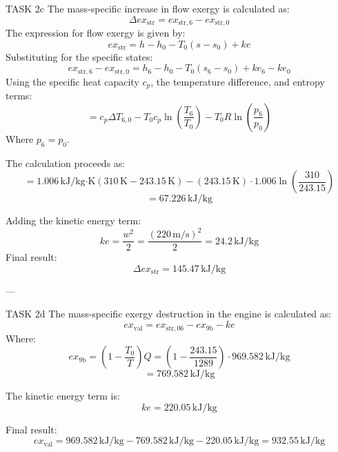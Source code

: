 TASK 2c  
The mass-specific increase in flow exergy is calculated as:  
\[
\Delta ex_{\text{str}} = ex_{\text{str},6} - ex_{\text{str},0}
\]  
The expression for flow exergy is given by:  
\[
ex_{\text{str}} = h - h_0 - T_0 (s - s_0) + ke
\]  
Substituting for the specific states:  
\[
ex_{\text{str},6} - ex_{\text{str},0} = h_6 - h_0 - T_0 (s_6 - s_0) + ke_6 - ke_0
\]  
Using the specific heat capacity \( c_p \), the temperature difference, and entropy terms:  
\[
= c_p \Delta T_{6,0} - T_0 c_p \ln \left( \frac{T_6}{T_0} \right) - T_0 R \ln \left( \frac{p_6}{p_0} \right)
\]  
Where \( p_6 = p_0 \).  

The calculation proceeds as:  
\[
= 1.006 \, \text{kJ/kg·K} \left( 310 \, \text{K} - 243.15 \, \text{K} \right) - (243.15 \, \text{K}) \cdot 1.006 \ln \left( \frac{310}{243.15} \right)
\]  
\[
= 67.226 \, \text{kJ/kg}
\]  

Adding the kinetic energy term:  
\[
ke = \frac{w^2}{2} = \frac{(220 \, \text{m/s})^2}{2} = 24.2 \, \text{kJ/kg}
\]  
Final result:  
\[
\Delta ex_{\text{str}} = 145.47 \, \text{kJ/kg}
\]  

---

TASK 2d  
The mass-specific exergy destruction in the engine is calculated as:  
\[
ex_{\text{val}} = ex_{\text{str},06} - ex_{\text{9b}} - ke
\]  
Where:  
\[
ex_{\text{9b}} = (1 - \frac{T_0}{T}) Q = (1 - \frac{243.15}{1289}) \cdot 969.582 \, \text{kJ/kg}
\]  
\[
= 769.582 \, \text{kJ/kg}
\]  

The kinetic energy term is:  
\[
ke = 220.05 \, \text{kJ/kg}
\]  

Final result:  
\[
ex_{\text{val}} = 969.582 \, \text{kJ/kg} - 769.582 \, \text{kJ/kg} - 220.05 \, \text{kJ/kg} = 932.55 \, \text{kJ/kg}
\]  